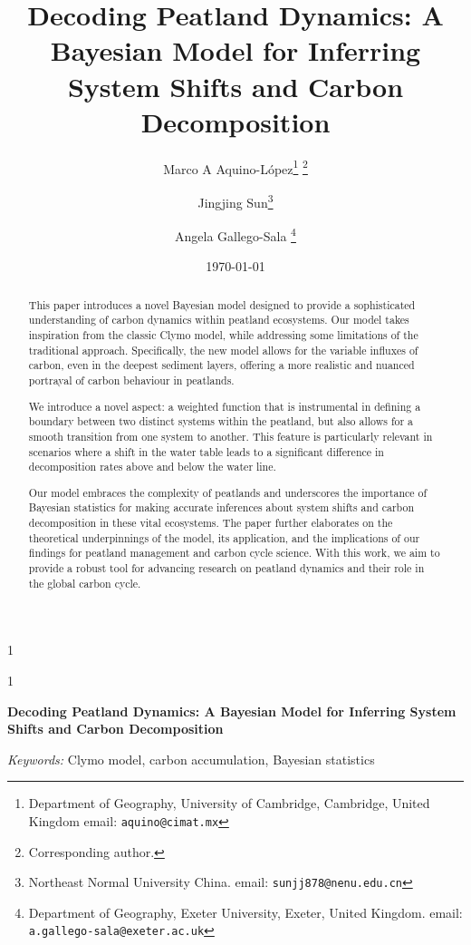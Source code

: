 \documentclass [10pt] {article}
\date{\today}
\newcommand{\blind}{1}
\newcommand{\papertitle}{
	Decoding Peatland Dynamics: A Bayesian Model for Inferring System Shifts and Carbon Decomposition
}
\begin{document}
	\def\spacingset#1{\renewcommand{\baselinestretch}%
		{#1}\small\normalsize} \spacingset{1}
	\blind
	{
		\title{\textbf{\papertitle}}

		\author{Marco A Aquino-L\'opez\thanks{
				Department of Geography, University of Cambridge, 
				Cambridge, United Kingdom
				email: \texttt{aquino@cimat.mx} } \thanks{Corresponding author.}
					\and
			Jingjing Sun\thanks{
				Northeast Normal University
				China. 
				email: \texttt{sunjj878@nenu.edu.cn}}
					\and
			Angela Gallego-Sala \thanks{
				Department of Geography, Exeter University,
				Exeter, United Kingdom.
				email: \texttt{a.gallego-sala@exeter.ac.uk}  }
			}
		\maketitle
	} \fi

	\blind
	{
		\bigskip
		\bigskip
		\bigskip
		\begin{center}
			{\LARGE\bf \papertitle}
		\end{center}
		\medskip
	} \fi
\bigskip

\begin{abstract}
	This paper introduces a novel Bayesian model designed to provide a sophisticated understanding of carbon dynamics within peatland ecosystems. Our model takes inspiration from the classic Clymo model, while addressing some limitations of the traditional approach. Specifically, the new model allows for the variable influxes of carbon, even in the deepest sediment layers, offering a more realistic and nuanced portrayal of carbon behaviour in peatlands. 


We introduce a novel aspect: a weighted function that is instrumental in defining a boundary between two distinct systems within the peatland, but also allows for a smooth transition from one system to another. This feature is particularly relevant in scenarios where a shift in the water table leads to a significant difference in decomposition rates above and below the water line.

	Our model embraces the complexity of peatlands and underscores the importance of Bayesian statistics for making accurate inferences about system shifts and carbon decomposition in these vital ecosystems. The paper further elaborates on the theoretical underpinnings of the model, its application, and the implications of our findings for peatland management and carbon cycle science. With this work, we aim to provide a robust tool for advancing research on peatland dynamics and their role in the global carbon cycle. 

\end{abstract}
	\noindent%
	{\it Keywords:} Clymo model, carbon accumulation, Bayesian statistics	\vfill
	\newpage
	\spacingset{1.45} %
\end{document}
